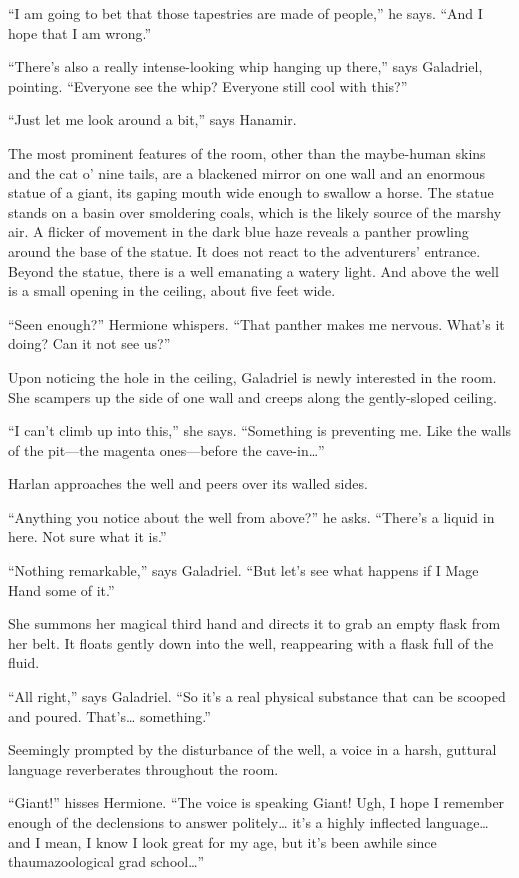 \documentclass[smalldemyvopaper,11pt,twoside,onecolumn,openright,extrafontsizes]{memoir}
\begin{document}
``I am going to bet that those tapestries are made of people,'' he says.
``And I hope that I am wrong.''

``There's also a really intense-looking whip hanging up there,'' says
Galadriel, pointing. ``Everyone see the whip? Everyone still cool with
this?''

``Just let me look around a bit,'' says Hanamir.

The most prominent features of the room, other than the maybe-human
skins and the cat o' nine tails, are a blackened mirror on one wall and
an enormous statue of a giant, its gaping mouth wide enough to swallow a
horse. The statue stands on a basin over smoldering coals, which is the
likely source of the marshy air. A flicker of movement in the dark blue
haze reveals a panther prowling around the base of the statue. It does
not react to the adventurers' entrance. Beyond the statue, there is a
well emanating a watery light. And above the well is a small opening in
the ceiling, about five feet wide.

``Seen enough?'' Hermione whispers. ``That panther makes me nervous.
What's it doing? Can it not see us?''

Upon noticing the hole in the ceiling, Galadriel is newly interested in
the room. She scampers up the side of one wall and creeps along the
gently-sloped ceiling.

``I can't climb up into this,'' she says. ``Something is preventing me.
Like the walls of the pit---the magenta ones---before the
cave-in\ldots{}''

Harlan approaches the well and peers over its walled sides.

``Anything you notice about the well from above?'' he asks. ``There's a
liquid in here. Not sure what it is.''

``Nothing remarkable,'' says Galadriel. ``But let's see what happens if
I Mage Hand some of it.''

She summons her magical third hand and directs it to grab an empty flask
from her belt. It floats gently down into the well, reappearing with a
flask full of the fluid.

``All right,'' says Galadriel. ``So it's a real physical substance that
can be scooped and poured. That's\ldots{} something.''

Seemingly prompted by the disturbance of the well, a voice in a harsh,
guttural language reverberates throughout the room.

``Giant!'' hisses Hermione. ``The voice is speaking Giant! Ugh, I hope I
remember enough of the declensions to answer politely\ldots{} it's a
highly inflected language\ldots{} and I mean, I know I look great for my
age, but it's been awhile since thaumazoological grad school\ldots{}''
\end{document}
